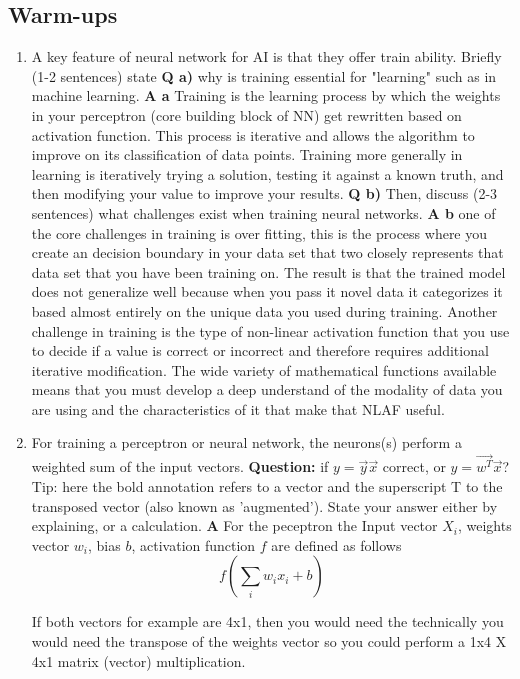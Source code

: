 \documentclass[main.tex]{subfiles}
\begin{document}
\subsection{Warm-ups}
\begin{enumerate}

\item A key feature of neural network for AI is that they offer train ability. Briefly (1-2 sentences) state \textbf{Q a)} why is training essential for "learning" such as in machine learning. \textbf{A a} Training is the learning process by which the weights in your perceptron (core building block of NN) get rewritten based on activation function. This process is iterative and allows the algorithm to improve on its classification of data points. Training more generally in learning is iteratively trying a solution, testing it against a known truth, and then modifying your value to improve your results. \textbf{Q b)} Then, discuss (2-3 sentences) what challenges exist when training neural networks. \textbf{A b} one of the core challenges in training is over fitting, this is the process where you create an decision boundary in your data set that two closely represents that data set that you have been training on. The result is that the trained model does not generalize well because when you pass it novel data it categorizes it based almost entirely on the unique data you used during training. Another challenge in training is the type of non-linear activation function that you use to decide if a value is correct or incorrect and therefore requires additional iterative modification. The wide variety of mathematical functions available means that you must develop a deep understand of the modality of data you are using and the characteristics of it that make that NLAF useful.

\item For training a perceptron or neural network, the neurons(s) perform a weighted sum of the input vectors. \textbf{Question:} if $y = \vec{y}\vec{x}$ correct, or $y=\vec{w^T}\vec{x}$? Tip: here the bold annotation refers to a vector and the superscript T to the transposed vector (also known as 'augmented'). State your answer either by explaining, or a calculation. \textbf{A} For the peceptron the Input vector $X_i$, weights vector $w_i$, bias $b$, activation function $f$ are defined as follows
$$f\left(\sum_{i} w_{i} x_{i}+b\right)$$

If both vectors for example are 4x1, then you would need the technically you would need the transpose of the weights vector so you could perform a 1x4 X 4x1 matrix (vector) multiplication.


\end{enumerate}
\end{document}
